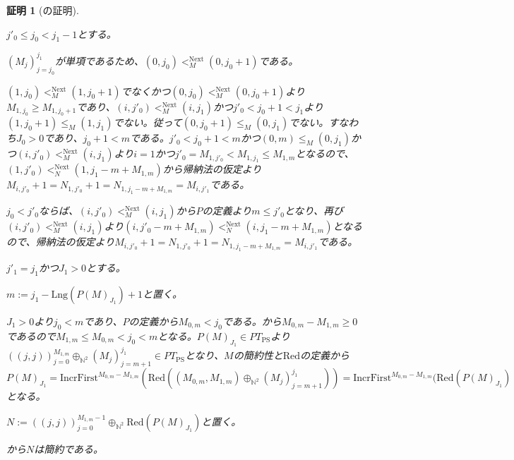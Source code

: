 \documentclass[dvipdfmx,uplatex]{jsarticle}
\theoremstyle{customnonumberbreakfortheorem}
\theoremstyle{customnonumberbreakforproof}
\newtheorem{hideableproof}{証明}
\begin{document}
\begin{hideableproof}[の証明]
\begin{indented}
\begin{indented}
\begin{indented}
\begin{indented}
\begin{indented}
\begin{indented}
\begin{indented}
							\end{indented}
							\item \(j'_0 \leq j_0 < j_1 - 1\)とする。
							\begin{indented}
								\item \((M_j)_{j=j_0}^{j_1}\)が単項であるため、\((0,j_0) <_M^{\textrm{Next}} (0,j_0+1)\)である。
								\item \((1,j_0) <_M^{\textrm{Next}} (1,j_0+1)\)でなくかつ\((0,j_0) <_M^{\textrm{Next}} (0,j_0+1)\)より\(M_{1,j_0} \geq M_{1,j_0+1}\)であり、\((i,j'_0) <_M^{\textrm{Next}} (i,j_1)\)かつ\(j'_0 < j_0+1 < j_1\)より\((1,j_0+1) \leq_M (1,j_1)\)でない。従って\((0,j_0+1) \leq_M (0,j_1)\)でない。すなわち\(J_0 > 0\)であり、\(j_0 + 1 < m\)である。\(j'_0 < j_0 + 1 < m\)かつ\((0,m) \leq_M (0,j_1)\)かつ\((i,j'_0) <_M^{\textrm{Next}} (i,j_1)\)より\(i = 1\)かつ\(j'_0 = M_{1,j'_0} < M_{1,j_1} \leq M_{1,m}\)となるので、\((1,j'_0) <_N^{\textrm{Next}} (1,j_1 - m + M_{1,m})\)から帰納法の仮定より\(M_{i,j'_0}+1 = N_{1,j'_0} + 1 = N_{1,j_1 - m + M_{1,m}} = M_{i,j'_1}\)である。
							\end{indented}
							\item \(j_0 < j'_0\)ならば、\((i,j'_0) <_M^{\textrm{Next}} (i,j_1)\)から\(P\)の定義より\(m \leq j'_0\)となり、再び\((i,j'_0) <_M^{\textrm{Next}} (i,j_1)\)より\((i,j'_0-m+M_{1,m}) <_N^{\textrm{Next}} (i,j_1-m+M_{1,m})\)となるので、帰納法の仮定より\(M_{i,j'_0}+1 = N_{1,j'_0} + 1 = N_{1,j_1 - m + M_{1,m}} = M_{i,j'_1}\)である。
						\end{indented}
						\item \(j'_1 = j_1\)かつ\(J_1 > 0\)とする。
						\begin{indented}
							\item \(m := j_1 - \textrm{Lng}(P(M)_{J_1}) + 1\)と置く。
							\item \(J_1 > 0\)より\(j_0 < m\)であり、\(P\)の定義から\(M_{0,m} < j_0\)である。から\(M_{0,m}-M_{1,m} \geq 0\)であるので\(M_{1,m} \leq M_{0,m} < j_0 < m\)となる。\(P(M)_{J_1} \in PT_{\textrm{PS}}\)より\(((j,j))_{j=0}^{M_{1,m}} \oplus_{\mathbb{N}^2} (M_j)_{j=m+1}^{j_1} \in PT_{\textrm{PS}}\)となり、\(M\)の簡約性と\(\textrm{Red}\)の定義から\(P(M)_{J_1} = \textrm{IncrFirst}^{M_{0,m}-M_{1,m}}(\textrm{Red}((M_{0,m},M_{1,m}) \oplus_{\mathbb{N}^2} (M_j)_{j=m+1}^{j_1})) =  \textrm{IncrFirst}^{M_{0,m}-M_{1,m}}(\textrm{Red}(P(M)_{J_1})\)となる。
							\item \(N := ((j,j))_{j=0}^{M_{1,m}-1} \oplus_{\mathbb{N}^2} \textrm{Red}(P(M)_{J_1})\)と置く。
							\item {}から\(N\)は簡約である。

\end{indented}
\end{indented}
\end{indented}
\end{indented}
\end{indented}
\end{indented}
\end{hideableproof}
\end{document}

